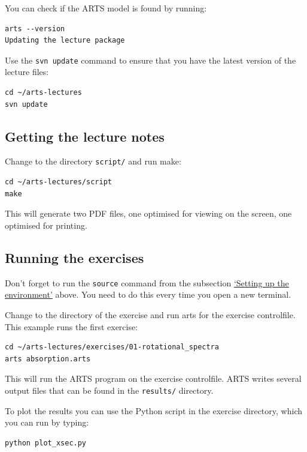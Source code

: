 You can check if the ARTS model is found by running:

\begin{verbatim}
arts --version
Updating the lecture package
\end{verbatim}

Use the \verb|svn update| command to ensure that you have the latest version
of the lecture files:

\begin{verbatim}
cd ~/arts-lectures
svn update
\end{verbatim}

\subsection*{Getting the lecture notes}

Change to the directory \texttt{script/} and run make:

\begin{verbatim}
cd ~/arts-lectures/script
make
\end{verbatim}

This will generate two PDF files, one optimised for viewing on the screen, one
optimised for printing.

\subsection*{Running the exercises}

Don't forget to run the \verb|source| command from the subsection
\hyperref[sec:setup-env]{`Setting up the environment'} above. You need to do
this every time you open a new terminal.

Change to the directory of the exercise and run arts for the exercise
controlfile. This example runs the first exercise:

\begin{verbatim}
cd ~/arts-lectures/exercises/01-rotational_spectra
arts absorption.arts
\end{verbatim}

This will run the ARTS program on the exercise controlfile. ARTS writes
several output files that can be found in the \texttt{results/} directory.

To plot the results you can use the Python script in the exercise directory,
which you can run by typing:

\begin{verbatim}
python plot_xsec.py
\end{verbatim}


